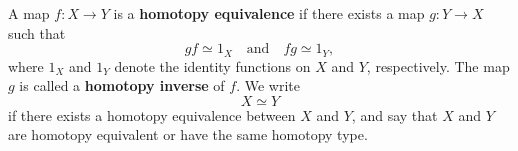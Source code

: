 A map $f: X \to Y$ is a \textbf{homotopy equivalence} if there exists a map $g: Y \to X$ such that
$$gf \simeq 1_X \quad \text{and} \quad fg \simeq 1_Y,$$
where $1_X$ and $1_Y$ denote the identity functions on $X$ and $Y$, respectively. The map $g$ is called a \textbf{homotopy inverse} of $f$. We write
$$X \simeq Y$$
if there exists a homotopy equivalence between $X$ and $Y$, and say that $X$ and $Y$ are homotopy equivalent or have the same homotopy type.
